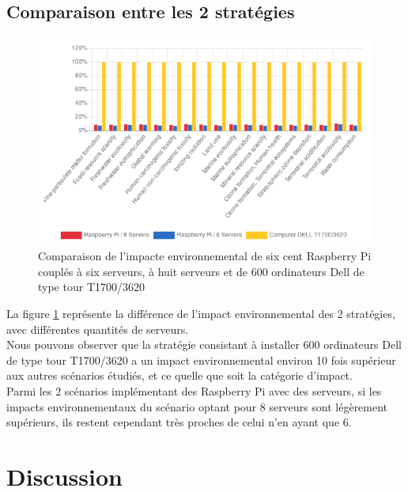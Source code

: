 \documentclass[12pt,a4paper]{paper}
\begin{document}
\subsection{Comparaison entre les 2 stratégies}

\begin{figure}[htbp]%
    \centering
    \includegraphics[width=\linewidth]{img/8vs6vsDELL.png}
    \caption{Comparaison de l'impacte environnemental de six cent Raspberry Pi couplés à six serveurs, à huit serveurs et de 600 ordinateurs Dell de type tour T1700/3620}
    \label{fig:8vs6vsDELL}
\end{figure}

La figure \ref{fig:8vs6vsDELL} représente la différence de l'impact environnemental des 2 stratégies, avec différentes quantités de serveurs. \\
Nous pouvons observer que la stratégie consistant à installer 600 ordinateurs Dell de type tour T1700/3620 a un impact environnemental environ 10 fois supérieur aux autres scénarios étudiés, et ce quelle que soit la catégorie d'impact. \\
Parmi les 2 scénarios implémentant des Raspberry Pi avec des serveurs, si les impacts environnementaux du scénario optant pour 8 serveurs sont légèrement supérieurs, ils restent cependant très proches de celui n'en ayant que 6.

\section{Discussion}
\end{document}
